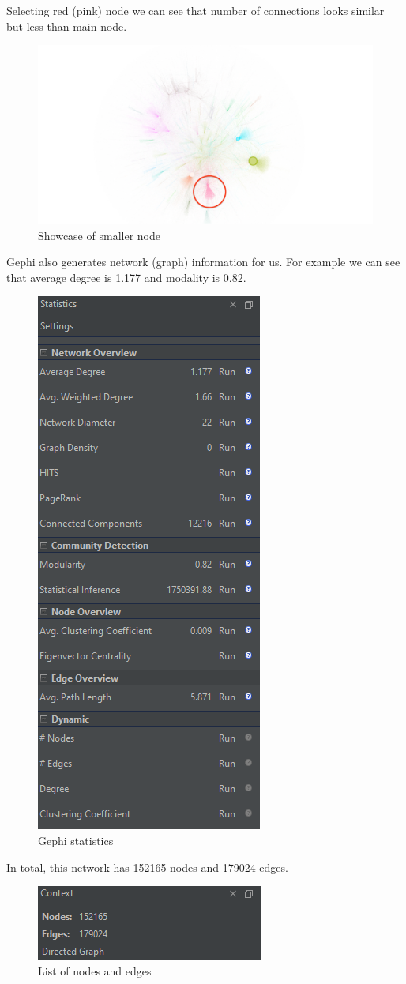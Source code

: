 Selecting red (pink) node we can see that number of connections looks similar but less than main node.
\begin{figure}[H]
\includegraphics[scale=0.4]{img/A2/Figure2.png}
\centering
\caption{Showcase of smaller node}
\label{fig:Fig2}
\end{figure}

Gephi also generates network (graph) information for us. For example we can see that average degree is 1.177 and modality is 0.82.
\begin{figure}[H]
\includegraphics[scale=0.7]{img/A2/Settings1.PNG}
\centering
\caption{Gephi statistics}
\label{fig:Settings1}
\end{figure}

In total, this network has 152165 nodes and 179024 edges.
\begin{figure}[H]
\includegraphics[scale=0.7]{img/A2/Settings2.PNG}
\centering
\caption{List of nodes and edges}
\label{fig:Settings2}
\end{figure}